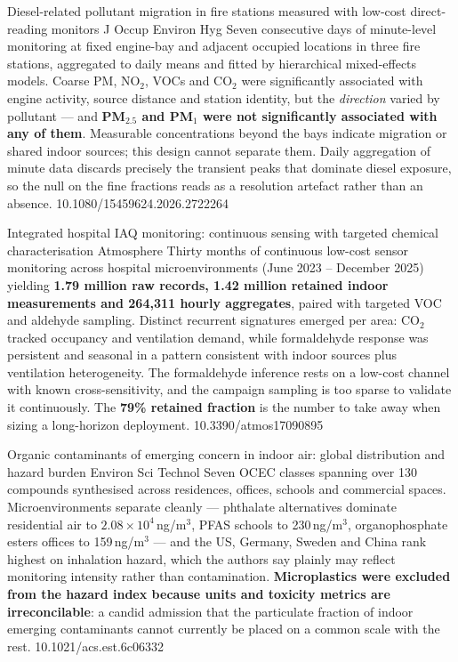\documentclass[10pt]{article}
\begin{document}

{Diesel-related pollutant migration in fire stations measured with low-cost direct-reading
monitors}
{J Occup Environ Hyg}
{Seven consecutive days of minute-level monitoring at fixed engine-bay and adjacent
occupied locations in three fire stations, aggregated to daily means and fitted by
hierarchical mixed-effects models. Coarse PM, NO$_2$, VOCs and CO$_2$ were significantly
associated with engine activity, source distance and station identity, but the
\emph{direction} varied by pollutant --- and \textbf{PM$_{2.5}$ and PM$_1$ were not
significantly associated with any of them}. Measurable concentrations beyond the bays
indicate migration or shared indoor sources; this design cannot separate them. Daily
aggregation of minute data discards precisely the transient peaks that dominate diesel
exposure, so the null on the fine fractions reads as a resolution artefact rather than an
absence.}
{10.1080/15459624.2026.2722264}

{Integrated hospital IAQ monitoring: continuous sensing with targeted chemical
characterisation}
{Atmosphere}
{Thirty months of continuous low-cost sensor monitoring across hospital microenvironments
(June 2023 -- December 2025) yielding \textbf{1.79 million raw records, 1.42 million
retained indoor measurements and 264{,}311 hourly aggregates}, paired with targeted VOC
and aldehyde sampling. Distinct recurrent signatures emerged per area: CO$_2$ tracked
occupancy and ventilation demand, while formaldehyde response was persistent and seasonal
in a pattern consistent with indoor sources plus ventilation heterogeneity. The
formaldehyde inference rests on a low-cost channel with known cross-sensitivity, and the
campaign sampling is too sparse to validate it continuously. The \textbf{79\% retained
fraction} is the number to take away when sizing a long-horizon deployment.}
{10.3390/atmos17090895}

{Organic contaminants of emerging concern in indoor air: global distribution and hazard
burden}
{Environ Sci Technol}
{Seven OCEC classes spanning over 130 compounds synthesised across residences, offices,
schools and commercial spaces. Microenvironments separate cleanly --- phthalate
alternatives dominate residential air to $2.08\times10^4$\,ng/m$^3$, PFAS schools to
230\,ng/m$^3$, organophosphate esters offices to 159\,ng/m$^3$ --- and the US, Germany,
Sweden and China rank highest on inhalation hazard, which the authors say plainly may
reflect monitoring intensity rather than contamination. \textbf{Microplastics were
excluded from the hazard index because units and toxicity metrics are irreconcilable}:
a candid admission that the particulate fraction of indoor emerging contaminants cannot
currently be placed on a common scale with the rest.}
{10.1021/acs.est.6c06332}
\end{document}
